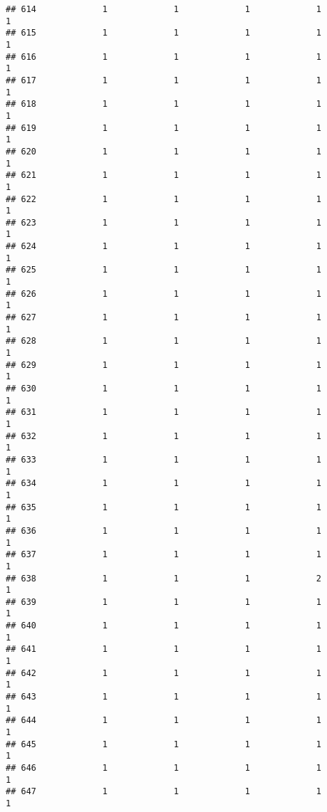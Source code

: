 \documentclass[
]{article}
\begin{document}
\begin{verbatim}
## 614             1             1             1             1             1
## 615             1             1             1             1             1
## 616             1             1             1             1             1
## 617             1             1             1             1             1
## 618             1             1             1             1             1
## 619             1             1             1             1             1
## 620             1             1             1             1             1
## 621             1             1             1             1             1
## 622             1             1             1             1             1
## 623             1             1             1             1             1
## 624             1             1             1             1             1
## 625             1             1             1             1             1
## 626             1             1             1             1             1
## 627             1             1             1             1             1
## 628             1             1             1             1             1
## 629             1             1             1             1             1
## 630             1             1             1             1             1
## 631             1             1             1             1             1
## 632             1             1             1             1             1
## 633             1             1             1             1             1
## 634             1             1             1             1             1
## 635             1             1             1             1             1
## 636             1             1             1             1             1
## 637             1             1             1             1             1
## 638             1             1             1             2             1
## 639             1             1             1             1             1
## 640             1             1             1             1             1
## 641             1             1             1             1             1
## 642             1             1             1             1             1
## 643             1             1             1             1             1
## 644             1             1             1             1             1
## 645             1             1             1             1             1
## 646             1             1             1             1             1
## 647             1             1             1             1             1

\end{verbatim}
\end{document}
